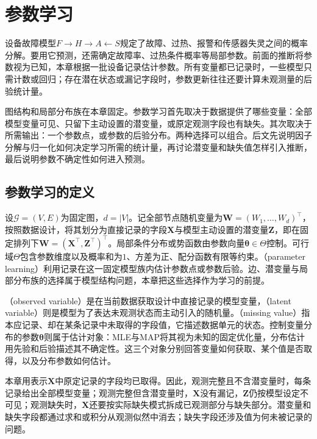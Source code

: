 \chapter{参数学习}
\label{chap:pgm-parameter-learning}

设备故障模型$F\to H\to A\leftarrow S$规定了故障、过热、报警和传感器失灵之间的概率分解。要用它预测，还需确定故障率、过热条件概率等局部参数。前面的推断将参数视为已知，本章根据一批设备记录估计参数。所有变量都已记录时，一些模型只需计数或回归；存在潜在状态或漏记字段时，参数更新往往还要计算未观测量的后验统计量。

图结构和局部分布族在本章固定。参数学习首先取决于数据提供了哪些变量：全部模型变量可见、只留下主动设置的潜变量，或原定观测字段也有缺失。其次取决于所需输出：一个参数点，或参数的后验分布。两种选择可以组合。后文先说明因子分解与归一化如何决定学习所需的统计量，再讨论潜变量和缺失值怎样引入推断，最后说明参数不确定性如何进入预测。

\section{参数学习的定义}
\label{sec:pgm-parameter-learning-definition}

设$\mathcal{G}=(V,E)$为固定图，$d=|V|$。记全部节点随机变量为$\bm{W}=(W_1,\ldots,W_d)^\top$，按照数据设计，将其划分为直接记录的字段$\bm{X}$与模型主动设置的潜变量$\bm{Z}$，即在固定排列下$\bm{W}=(\bm{X}^\top,\bm{Z}^\top)^\top$。局部条件分布或势函数由参数向量$\bm{\theta}\in\Theta$控制。可行域$\Theta$包含参数维度以及概率和为$1$、方差为正、配分函数有限等约束。（parameter learning）利用记录在这一固定模型族内估计参数点或参数后验。边、潜变量与局部分布族的选择属于模型结构问题，本章把这些选择作为学习的前提。

（observed variable）是在当前数据获取设计中直接记录的模型变量，（latent variable）则是模型为了表达未观测状态而主动引入的随机量。（missing value）指本应记录、却在某条记录中未取得的字段值，它描述数据单元的状态。控制变量分布的参数$\bm{\theta}$则属于估计对象：MLE与MAP将其视为未知的固定优化量，分布估计用先验和后验描述其不确定性。这三个对象分别回答变量如何获取、某个值是否取得，以及分布参数如何估计。

本章用表示$\bm{X}$中原定记录的字段均已取得。因此，观测完整且不含潜变量时，每条记录给出全部模型变量；观测完整但含潜变量时，$\bm{X}$没有漏记，$\bm{Z}$仍按模型设定不可见；观测缺失时，$\bm{X}$还要按实际缺失模式拆成已观测部分与缺失部分。潜变量和缺失字段都通过求和或积分从观测似然中消去；缺失字段还涉及值为何未被记录的问题。

